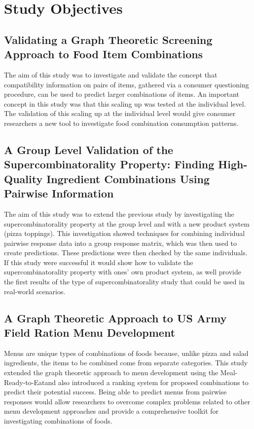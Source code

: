 \chapter{Study Objectives}
\section{Validating a Graph Theoretic Screening Approach to Food Item Combinations}

The aim of this study was to investigate and validate the concept that compatibility information on pairs of items, gathered via a consumer questioning procedure, can be used to predict larger combinations of items.  An important concept in this study was that this scaling up was tested at the individual level.  The validation of this scaling up at the individual level would give consumer researchers a new tool to investigate food combination consumption patterns.

\section{A Group Level Validation of the Supercombinatorality Property: Finding High-Quality Ingredient Combinations Using Pairwise Information}
The aim of this study was to extend the previous study by investigating the supercombinatorality property at the group level and with a new product system (pizza toppings).  This investigation showed techniques for combining individual pairwise response data into a group response matrix, which was then used to create predictions. These predictions were then checked by the same individuals.  If this study were successful it would show how to validate the supercombinatorality property with ones’ own product system, as well provide the first results of the type of supercombinatorality study that could be used in real-world scenarios.  
\section{A Graph Theoretic Approach to US Army Field Ration Menu Development}
Menus are unique types of combinations of foods because, unlike pizza and salad ingredients, the items to be combined come from separate categories.  This study extended the graph theoretic approach to menu development using the Meal-Ready-to-Eat\tm and also introduced a ranking system for proposed combinations to predict their potential success.  Being able to predict menus from pairwise responses would allow researchers to overcome complex problems related to other menu development approaches and provide a comprehensive toolkit for investigating combinations of foods.